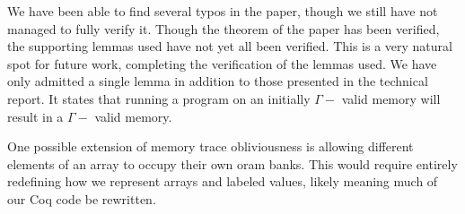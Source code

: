 \documentclass[10pt,  onecolumn]{article}
\begin{document}
We have been able to find several typos in the paper, though we still have not managed to fully verify it. 
Though the theorem of the paper has been verified, the supporting lemmas used have not yet all been verified. 
This is a very natural spot for future work, completing the verification of the lemmas used. 
We have only admitted a single lemma in addition to those presented in the technical report. 
It states that running a program on an initially $\Gamma-$ valid memory will result in a  $\Gamma-$ valid memory.%

One possible extension of memory trace obliviousness is allowing different elements of an array to occupy their own oram banks. 
This would require entirely redefining how we represent arrays and labeled values, likely meaning much of our Coq code be rewritten.








%
%
\cite{sf}
\cite{mtope}
\cite{techreport}
\cite{strongind}






\end{document}
